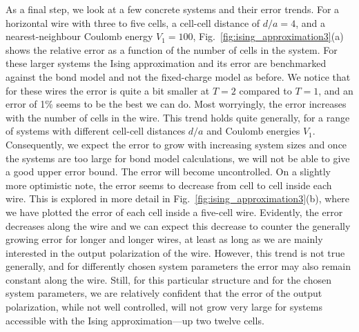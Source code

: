 As a final step, we look at a few concrete systems and their error trends. For a
horizontal wire with three to five cells, a cell-cell distance of $d/a = 4$, and
a nearest-neighbour Coulomb energy $V_1 = 100$,
Fig.~\ref{fig:ising_approximation3}(a) shows the relative error as a function of
the number of cells in the system. For these larger systems the Ising
approximation and its error are benchmarked against the bond model and not the
fixed-charge model as before. We notice that for these wires the error is quite
a bit smaller at $T = 2$ compared to $T = 1$, and an error of 1\% seems to be
the best we can do. Most worryingly, the error increases with the number of
cells in the wire. This trend holds quite generally, for a range of systems with
different cell-cell distances $d/a$ and Coulomb energies $V_1$. Consequently, we
expect the error to grow with increasing system sizes and once the systems are
too large for bond model calculations, we will not be able to give a good upper
error bound. The error will become uncontrolled. On a slightly more optimistic
note, the error seems to decrease from cell to cell inside each wire. This is
explored in more detail in Fig.~\ref{fig:ising_approximation3}(b), where we have
plotted the error of each cell inside a five-cell wire. Evidently, the error
decreases along the wire and we can expect this decrease to counter the
generally growing error for longer and longer wires, at least as long as we are
mainly interested in the output polarization of the wire. However, this trend is
not true generally, and for differently chosen system parameters the error may
also remain constant along the wire. Still, for this particular 
structure and for the chosen system parameters, we are relatively confident that
the error of the output polarization, while not well controlled, will not grow
very large for systems accessible with the Ising approximation---up two twelve
 cells. 
%
